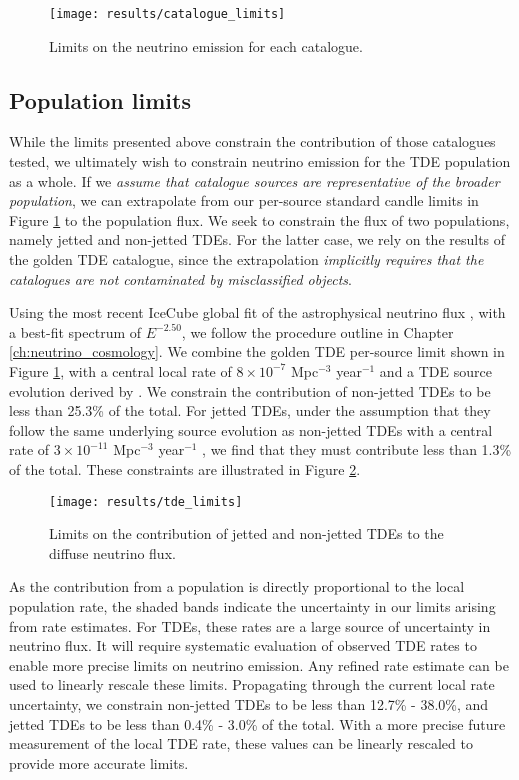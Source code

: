 \begin{figure}[!ht]
	\centering \texttt{[image: results/catalogue\_limits]}
	\caption{Limits on the neutrino emission for each catalogue.}
	\label{fig:cat_upper_limit}
\end{figure}

\subsection{Population limits}

While the limits presented above constrain the contribution of those catalogues tested, we ultimately wish to constrain neutrino emission for the TDE population as a whole. If we \emph{assume that catalogue sources are representative of the broader population}, we can extrapolate from our per-source standard candle limits in Figure \ref{fig:cat_upper_limit} to the population flux. We seek to constrain the flux of two populations, namely jetted and non-jetted TDEs. For the latter case, we rely on the results of the golden TDE catalogue, since the extrapolation \emph{implicitly requires that the catalogues are not contaminated by misclassified objects}.

Using the most recent IceCube global fit of the astrophysical neutrino flux , with a best-fit spectrum of $E^{-2.50}$, we follow the procedure outline in Chapter \ref{ch:neutrino_cosmology}. We combine the golden TDE per-source limit shown in Figure \ref{fig:cat_upper_limit}, with a central local rate of $8 \times 10^{-7}$ Mpc$^{-3}$ year$^{-1}$  and a TDE source evolution derived by \cite{Sun:2015bda}. We constrain the contribution of non-jetted TDEs to be less than 25.3\% of the total. For jetted TDEs, under the assumption that they follow the same underlying source evolution as non-jetted TDEs with a central rate of $3 \times 10^{-11}$ Mpc$^{-3}$ year$^{-1}$ , we find that they must contribute less than 1.3\% of the total.  These constraints are illustrated in Figure \ref{fig:DiffuseFlux}. 

\begin{figure}[!ht]
	\centering \texttt{[image: results/tde\_limits]}
	\caption{Limits on the contribution of jetted and non-jetted TDEs to the diffuse neutrino flux.}
	\label{fig:DiffuseFlux}
\end{figure}

As the contribution from a population is directly proportional to the local population rate, the shaded bands indicate the uncertainty in our limits arising from rate estimates. For TDEs, these rates are a large source of uncertainty in neutrino flux. It will require systematic evaluation of observed TDE rates to enable more precise limits on neutrino emission. Any refined rate estimate can be used to linearly rescale these limits. Propagating through the current local rate uncertainty, we constrain non-jetted TDEs to be less than 12.7\% - 38.0\%, and jetted TDEs to be less than 0.4\% - 3.0\% of the total. With a more precise future measurement of the local TDE rate, these values can be linearly rescaled to provide more accurate limits.

